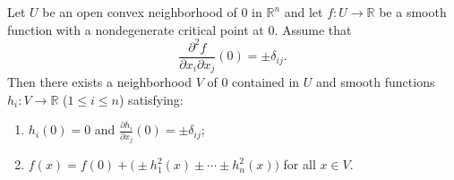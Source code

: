 Let $U$ be an open convex neighborhood of $0$ in $\mathbb{R}^n$ and let $f: U \to \mathbb{R}$ be a smooth function with a nondegenerate critical point at $0$. Assume that
$$\frac{\partial^2 f}{\partial x_i \partial x_j}(0) = \pm \delta_{ij}.$$
Then there exists a neighborhood $V$ of $0$ contained in $U$ and smooth functions $h_i: V \to \mathbb{R}$ ($1 \leq i \leq n$) satisfying:
\begin{enumerate}
  \item[(a)] $h_i(0) = 0$ and $\displaystyle \frac{\partial h_i}{\partial x_j}(0) = \pm \delta_{ij}$;
  \item[(b)] $\displaystyle f(x) = f(0) + \bigl(\pm h_1^2(x) \pm \cdots \pm h_n^2(x)\bigr)$ for all $x \in V$.
\end{enumerate}

